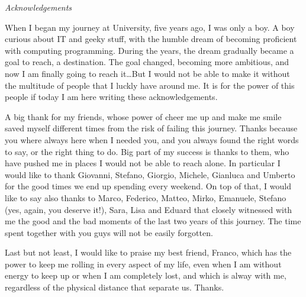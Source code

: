 \cleardoublepage
{}
\thispagestyle{empty}


\begingroup
\let\clearpage\relax
\let\cleardoublepage\relax
\let\cleardoublepage\relax


\noindent \textit{Acknowledgements}\\
\bigskip

\noindent When I began my journey at University, five years ago, I was only
a boy. A boy curious about IT and geeky stuff, with the humble dream of becoming
proficient with computing programming. During the years, the dream gradually
became a goal to reach, a destination. The goal changed, becoming more
ambitious, and now I am finally going to reach it\dots But I would not be able
to make it without the multitude of people that I luckly have around me. It is
for the power of this people if today I am here writing these acknowledgements.

\vspace{0.3cm}

\noindent A big thank for my friends, whose power of cheer me up and make me
smile saved myself different times from the risk of failing this journey. Thanks
because you where always here when I needed you, and you always found the right
words to say, or the right thing to do. Big part of my success is thanks to
them, who have pushed me in places I would not be able to reach alone. In
particular I would like to thank Giovanni, Stefano, Giorgio, Michele, Gianluca
and Umberto for the good times we end up spending every weekend. On top of that,
I would like to say also thanks to Marco, Federico, Matteo, Mirko, Emanuele,
Stefano (yes, again, you deserve it!), Sara, Lisa and Eduard that closely
witnessed with me the good and the bad moments of the last two years of this
journey. The time spent together with you guys will not be easily forgotten.

\vspace{0.3cm}

\noindent Last but not least, I would like to praise my best friend, Franco,
which has the power to keep me rolling in every aspect of my life, even when I
am without energy to keep up or when I am completely lost, and which is alway
with me, regardless of the physical distance that separate us. Thanks.

